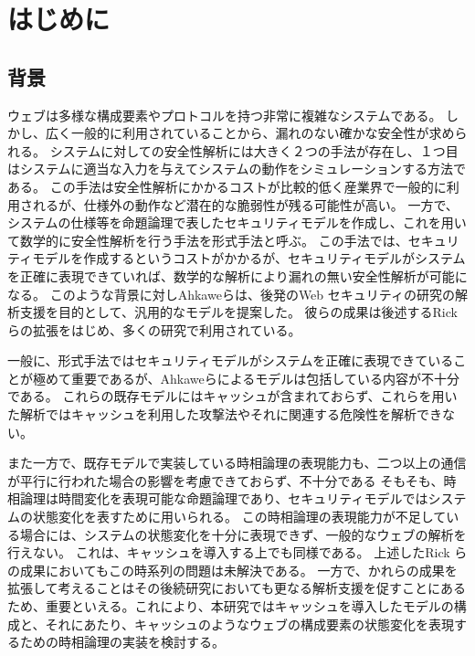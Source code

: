 \documentclass[journal]{IEEEtran}
\begin{document}
\section{はじめに}
\label{sec:introduction}

\subsection{背景}
ウェブは多様な構成要素やプロトコルを持つ非常に複雑なシステムである。
しかし、広く一般的に利用されていることから、漏れのない確かな安全性が求められる。
システムに対しての安全性解析には大きく２つの手法が存在し、１つ目はシステムに適当な入力を与えてシステムの動作をシミュレーションする方法である。
この手法は安全性解析にかかるコストが比較的低く産業界で一般的に利用されるが、仕様外の動作など潜在的な脆弱性が残る可能性が高い。
一方で、システムの仕様等を命題論理で表したセキュリティモデルを作成し、これを用いて数学的に安全性解析を行う手法を形式手法と呼ぶ。
この手法では、セキュリティモデルを作成するというコストがかかるが、セキュリティモデルがシステムを正確に表現できていれば、数学的な解析により漏れの無い安全性解析が可能になる。
このような背景に対しAhkaweら\cite{based-model}は、後発のWeb セキュリティの研究の解析支援を目的として、汎用的なモデルを提案した。
彼らの成果は後述するRickら\cite{cookie-model}の拡張をはじめ、多くの研究で利用されている\cite{chaitanya2017formal, bagheri2016practical, chen2015aspire, nelson2013aluminum, somorovsky2011all}。

一般に、形式手法ではセキュリティモデルがシステムを正確に表現できていることが極めて重要であるが、Ahkaweらによるモデルは包括している内容が不十分である。
これらの既存モデルにはキャッシュが含まれておらず、これらを用いた解析ではキャッシュを利用した攻撃法やそれに関連する危険性を解析できない。

また一方で、既存モデルで実装している時相論理の表現能力も、二つ以上の通信が平行に行われた場合の影響を考慮できておらず、不十分である
そもそも、時相論理は時間変化を表現可能な命題論理であり、セキュリティモデルではシステムの状態変化を表すために用いられる。
この時相論理の表現能力が不足している場合には、システムの状態変化を十分に表現できず、一般的なウェブの解析を行えない。
これは、キャッシュを導入する上でも同様である。
上述したRick らの成果\cite{cookie-model}においてもこの時系列の問題は未解決である。
一方で、かれらの成果を拡張して考えることはその後続研究においても更なる解析支援を促すことにあるため、重要といえる。これにより、本研究ではキャッシュを導入したモデルの構成と、それにあたり、キャッシュのようなウェブの構成要素の状態変化を表現するための時相論理の実装を検討する。
\end{document}
